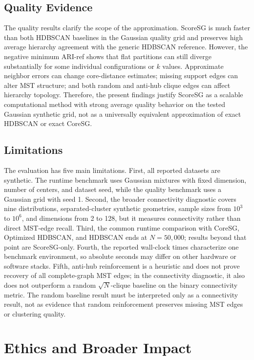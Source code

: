 \documentclass[11pt]{article}
\begin{document}
\subsection{Quality Evidence}

The quality results clarify the scope of the approximation. ScoreSG is much faster than both HDBSCAN baselines in the Gaussian quality grid and preserves high average hierarchy agreement with the generic HDBSCAN reference. However, the negative minimum ARI-ref shows that flat partitions can still diverge substantially for some individual configurations or \(k\) values. Approximate neighbor errors can change core-distance estimates; missing support edges can alter MST structure; and both random and anti-hub clique edges can affect hierarchy topology. Therefore, the present findings justify ScoreSG as a scalable computational method with strong average quality behavior on the tested Gaussian synthetic grid, not as a universally equivalent approximation of exact HDBSCAN or exact CoreSG.

\subsection{Limitations}

The evaluation has five main limitations. First, all reported datasets are synthetic. The runtime benchmark uses Gaussian mixtures with fixed dimension, number of centers, and dataset seed, while the quality benchmark uses a Gaussian grid with seed 1. Second, the broader connectivity diagnostic covers nine distributions, separated-cluster synthetic geometries, sample sizes from \(10^3\) to \(10^6\), and dimensions from 2 to 128, but it measures connectivity rather than direct MST-edge recall. Third, the common runtime comparison with CoreSG, Optimized HDBSCAN, and HDBSCAN ends at \(N=50{,}000\); results beyond that point are ScoreSG-only. Fourth, the reported wall-clock times characterize one benchmark environment, so absolute seconds may differ on other hardware or software stacks. Fifth, anti-hub reinforcement is a heuristic and does not prove recovery of all complete-graph MST edges; in the connectivity diagnostic, it also does not outperform a random \(\sqrt{N}\)-clique baseline on the binary connectivity metric. The random baseline result must be interpreted only as a connectivity result, not as evidence that random reinforcement preserves missing MST edges or clustering quality.

\section{Ethics and Broader Impact}
\end{document}

